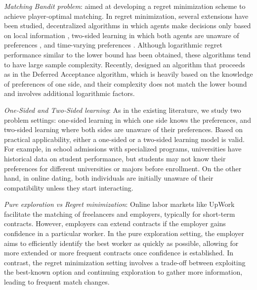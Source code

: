 \documentclass{article}
\begin{document}
\textit{Matching Bandit problem}: \cite{liu2020competing} aimed at developing a regret minimization scheme to achieve player-optimal matching. In regret minimization, several extensions have been studied, decentralized algorithms in which agents make decisions only based on local information \cite{liu2021decentralized,maheshwari2022decentralized,pmlr-v139-basu21a}, two-sided learning in which both agents are unaware of preferences \cite{pagaretwosided}, and time-varying preferences \cite{min2022learn,ghosh}. Although logarithmic regret performance similar to the lower bound has been obtained, these algorithms tend to have large sample complexity. Recently, \cite{hosseini2024putting} designed an algorithm that proceeds as in the Deferred Acceptance algorithm, which is heavily based on the knowledge of preferences of one side, and their complexity does not match the lower bound and involves additional logarithmic factors. 

\textit{One-Sided and Two-Sided learning}: As in the existing literature, we study two problem settings: one-sided learning in which one side knows the preferences, and two-sided learning where both sides are unaware of their preferences. Based on practical applicability, either a one-sided or a two-sided learning model is valid. For example, in school admissions with specialized programs, universities have historical data on student performance, but students may not know their preferences for different universities or majors before enrollment. On the other hand, in online dating, both individuals are initially unaware of their compatibility unless they start interacting. 

\textit{Pure exploration vs Regret minimization}: Online labor markets like UpWork facilitate the matching of freelancers and employers, typically for short-term contracts. However, employers can extend contracts if the employer gains confidence in a particular worker. In the pure exploration setting, the employer aims to efficiently identify the best worker as quickly as possible, allowing for more extended or more frequent contracts once confidence is established. In contrast, the regret minimization setting involves a trade-off between exploiting the best-known option and continuing exploration to gather more information, leading to frequent match changes.
\end{document}
